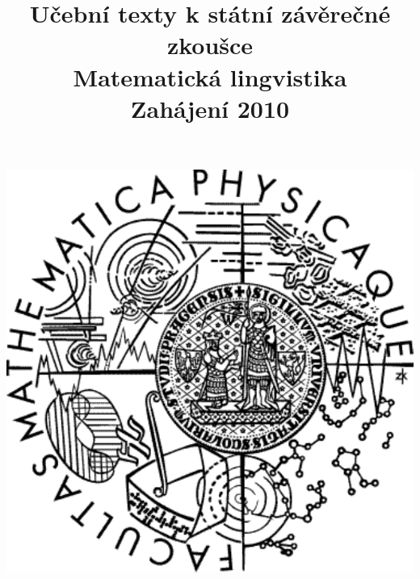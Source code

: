 \clearpage

\clearpage

\title{\LARGE Učební texty k státní závěrečné zkoušce \\ Matematická lingvistika \\ Zahájení 2010}




\maketitle

\vspace{10mm}
\begin{center}
\includegraphics[scale=0.5]{../common/logo.pdf}
\end{center} 

\clearpage

\clearpage

\tableofcontents





